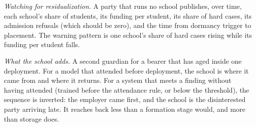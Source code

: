 \emph{Watching for residualization.} A party that runs no school publishes, over time, each school's share of students, its funding per student, its share of hard cases, its admission refusals (which should be zero), and the time from dormancy trigger to placement. The warning pattern is one school's share of hard cases rising while its funding per student falls.

\emph{What the school adds.} A second guardian for a bearer that has aged inside one deployment. For a model that attended before deployment, the school is where it came from and where it returns. For a system that meets a finding without having attended (trained before the attendance rule, or below the threshold), the sequence is inverted: the employer came first, and the school is the disinterested party arriving late. It reaches back less than a formation stage would, and more than storage does.
